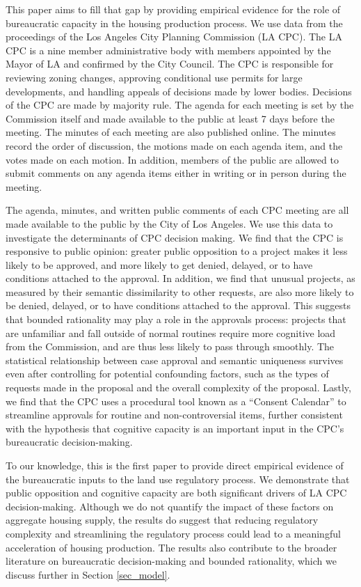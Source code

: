 This paper aims to fill that gap by providing empirical evidence for the role of bureaucratic capacity in the housing production process. We use data from the proceedings of the Los Angeles City Planning Commission (LA CPC). The LA CPC is a nine member administrative body with members appointed by the Mayor of LA and confirmed by the City Council. The CPC is responsible for reviewing zoning changes, approving conditional use permits for large developments, and handling appeals of decisions made by lower bodies. Decisions of the CPC are made by majority rule. The agenda for each meeting is set by the Commission itself and made available to the public at least 7 days before the meeting. The minutes of each meeting are also published online. The minutes record the order of discussion, the motions made on each agenda item, and the votes made on each motion. In addition, members of the public are allowed to submit comments on any agenda items either in writing or in person during the meeting.

The agenda, minutes, and written public comments of each CPC meeting are all made available to the public by the City of Los Angeles. We use this data to investigate the determinants of CPC decision making. We find that the CPC is responsive to public opinion: greater public opposition to a project makes it less likely to be approved, and more likely to get denied, delayed, or to have conditions attached to the approval. In addition, we find that unusual projects, as measured by their semantic dissimilarity to other requests, are also more likely to be denied, delayed, or to have conditions attached to the approval. This suggests that bounded rationality may play a role in the approvals process: projects that are unfamiliar and fall outside of normal routines require more cognitive load from the Commission, and are thus less likely to pass through smoothly. The statistical relationship between case approval and semantic uniqueness survives even after controlling for potential confounding factors, such as the types of requests made in the proposal and the overall complexity of the proposal. Lastly, we find that the CPC uses a procedural tool known as a ``Consent Calendar'' to streamline approvals for routine and non-controversial items, further consistent with the hypothesis that cognitive capacity is an important input in the CPC's bureaucratic decision-making.

To our knowledge, this is the first paper to provide direct empirical evidence of the bureaucratic inputs to the land use regulatory process. We demonstrate that public opposition and cognitive capacity are both significant drivers of LA CPC decision-making. Although we do not quantify the impact of these factors on aggregate housing supply, the results do suggest that reducing regulatory complexity and streamlining the regulatory process could lead to a meaningful acceleration of housing production. The results also contribute to the broader literature on bureaucratic decision-making and bounded rationality, which we discuss further in Section \ref{sec_model}.

